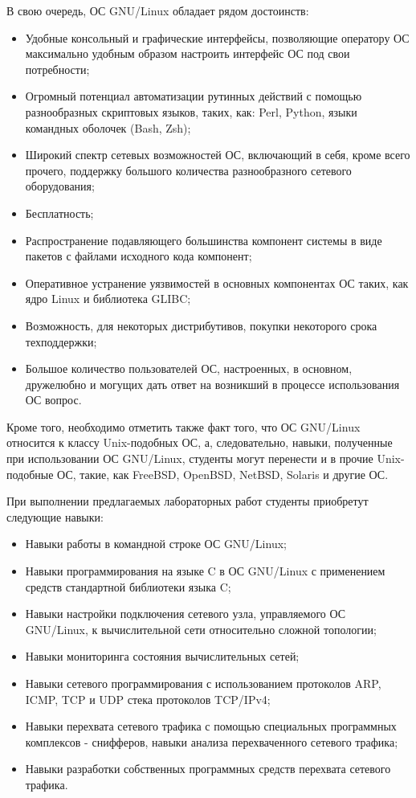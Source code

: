 	В свою очередь, ОС GNU/Linux обладает рядом достоинств:

	\begin{itemize}

		\item Удобные консольный и графические интерфейсы, позволяющие оператору ОС максимально удобным образом настроить интерфейс ОС под свои потребности;
		\item Огромный потенциал автоматизации рутинных действий с помощью разнообразных скриптовых языков, таких, как: Perl, Python, языки командных оболочек
		(Bash, Zsh);
		\item Широкий спектр сетевых возможностей ОС, включающий в себя, кроме всего прочего, поддержку большого количества разнообразного сетевого оборудования;
		\item Бесплатность;
		\item Распространение подавляющего большинства компонент системы в виде пакетов с файлами исходного кода компонент;
		\item Оперативное устранение уязвимостей в основных компонентах ОС таких, как ядро Linux и библиотека GLIBC;
		\item Возможность, для некоторых дистрибутивов, покупки некоторого срока техподдержки;
		\item Большое количество пользователей ОС, настроенных, в основном, дружелюбно и могущих дать ответ на возникший в процессе использования ОС вопрос.

	\end{itemize}

	Кроме того, необходимо отметить также факт того, что ОС GNU/Linux относится к классу Unix-подобных ОС, а, следовательно, навыки, полученные при использовании
	ОС GNU/Linux, студенты могут перенести и в прочие Unix-подобные ОС, такие, как FreeBSD, OpenBSD, NetBSD, Solaris и другие ОС.

	При выполнении предлагаемых лабораторных работ студенты приобретут следующие навыки:

	\begin{itemize}

		\item Навыки работы в командной строке ОС GNU/Linux;
		\item Навыки программирования на языке C в ОС GNU/Linux с применением средств стандартной библиотеки языка C;
		\item Навыки настройки подключения сетевого узла, управляемого ОС GNU/Linux, к вычислительной сети относительно сложной топологии;
		\item Навыки мониторинга состояния вычислительных сетей;
		\item Навыки сетевого программирования с использованием протоколов ARP, ICMP, TCP и UDP стека протоколов TCP/IPv4;
		\item Навыки перехвата сетевого трафика с помощью специальных программных комплексов - снифферов, навыки анализа перехваченного сетевого трафика;
		\item Навыки разработки собственных программных средств перехвата сетевого трафика.

	\end{itemize}

